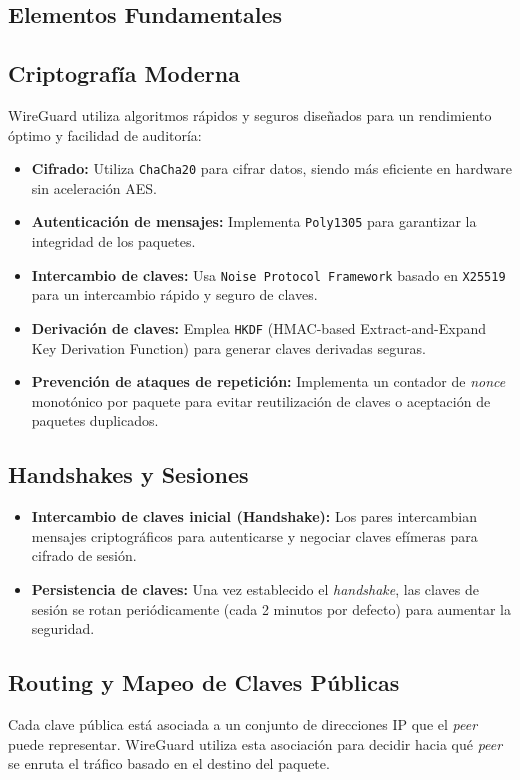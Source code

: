 \begin{enumerate}
\begin{enumerate}
   \section*{Elementos Fundamentales}
   
   \subsection*{Criptografía Moderna}
   WireGuard utiliza algoritmos rápidos y seguros diseñados para un rendimiento óptimo y facilidad de auditoría:
   \begin{itemize}
       \item \textbf{Cifrado:} Utiliza \texttt{ChaCha20} para cifrar datos, siendo más eficiente en hardware sin aceleración AES.
       \item \textbf{Autenticación de mensajes:} Implementa \texttt{Poly1305} para garantizar la integridad de los paquetes.
       \item \textbf{Intercambio de claves:} Usa \texttt{Noise Protocol Framework} basado en \texttt{X25519} para un intercambio rápido y seguro de claves.
       \item \textbf{Derivación de claves:} Emplea \texttt{HKDF} (HMAC-based Extract-and-Expand Key Derivation Function) para generar claves derivadas seguras.
       \item \textbf{Prevención de ataques de repetición:} Implementa un contador de \textit{nonce} monotónico por paquete para evitar reutilización de claves o aceptación de paquetes duplicados.
   \end{itemize}
   
   \subsection*{Handshakes y Sesiones}
   \begin{itemize}
       \item \textbf{Intercambio de claves inicial (Handshake):} Los pares intercambian mensajes criptográficos para autenticarse y negociar claves efímeras para cifrado de sesión.
       \item \textbf{Persistencia de claves:} Una vez establecido el \textit{handshake}, las claves de sesión se rotan periódicamente (cada 2 minutos por defecto) para aumentar la seguridad.
   \end{itemize}
   
   \subsection*{Routing y Mapeo de Claves Públicas}
   Cada clave pública está asociada a un conjunto de direcciones IP que el \textit{peer} puede representar. WireGuard utiliza esta asociación para decidir hacia qué \textit{peer} se enruta el tráfico basado en el destino del paquete.
   

\end{enumerate}
\end{enumerate}
